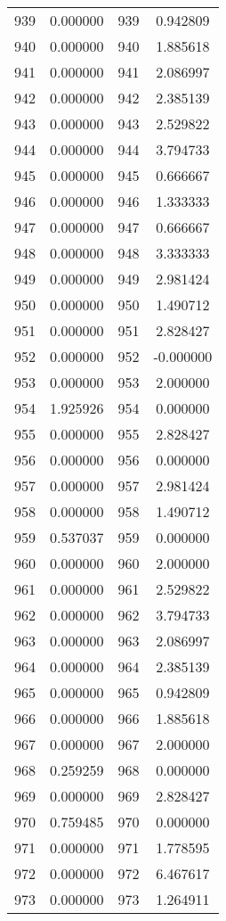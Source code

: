 \documentclass[12pt]{article}
\begin{document}
\begin{longtable}{@{}cccc@{}}
939 & 0.000000 & 939 & 0.942809 \\
940 & 0.000000 & 940 & 1.885618 \\
941 & 0.000000 & 941 & 2.086997 \\
942 & 0.000000 & 942 & 2.385139 \\
943 & 0.000000 & 943 & 2.529822 \\
944 & 0.000000 & 944 & 3.794733 \\
945 & 0.000000 & 945 & 0.666667 \\
946 & 0.000000 & 946 & 1.333333 \\
947 & 0.000000 & 947 & 0.666667 \\
948 & 0.000000 & 948 & 3.333333 \\
949 & 0.000000 & 949 & 2.981424 \\
950 & 0.000000 & 950 & 1.490712 \\
951 & 0.000000 & 951 & 2.828427 \\
952 & 0.000000 & 952 & -0.000000 \\
953 & 0.000000 & 953 & 2.000000 \\
954 & 1.925926 & 954 & 0.000000 \\
955 & 0.000000 & 955 & 2.828427 \\
956 & 0.000000 & 956 & 0.000000 \\
957 & 0.000000 & 957 & 2.981424 \\
958 & 0.000000 & 958 & 1.490712 \\
959 & 0.537037 & 959 & 0.000000 \\
960 & 0.000000 & 960 & 2.000000 \\
961 & 0.000000 & 961 & 2.529822 \\
962 & 0.000000 & 962 & 3.794733 \\
963 & 0.000000 & 963 & 2.086997 \\
964 & 0.000000 & 964 & 2.385139 \\
965 & 0.000000 & 965 & 0.942809 \\
966 & 0.000000 & 966 & 1.885618 \\
967 & 0.000000 & 967 & 2.000000 \\
968 & 0.259259 & 968 & 0.000000 \\
969 & 0.000000 & 969 & 2.828427 \\
970 & 0.759485 & 970 & 0.000000 \\
971 & 0.000000 & 971 & 1.778595 \\
972 & 0.000000 & 972 & 6.467617 \\
973 & 0.000000 & 973 & 1.264911 \\

\end{longtable}
\end{document}
